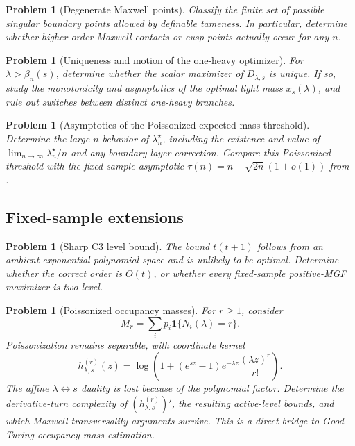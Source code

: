\documentclass[11pt]{article}
\theoremstyle{plain}
\newtheorem{problem}[theorem]{Problem}
\theoremstyle{definition}
\theoremstyle{remark}
\newcommand{\one}{\mathbf 1}
\begin{document}
\begin{problem}[Degenerate Maxwell points]
Classify the finite set of possible singular boundary points allowed by definable tameness.  In particular, determine whether higher-order Maxwell contacts or cusp points actually occur for any \(n\).
\end{problem}


\begin{problem}[Uniqueness and motion of the one-heavy optimizer]
For \(\lambda>\beta_n(s)\), determine whether the scalar maximizer of \(D_{\lambda,s}\) is unique.  If so, study the monotonicity and asymptotics of the optimal light mass \(x_s(\lambda)\), and rule out switches between distinct one-heavy branches.
\end{problem}

\begin{problem}[Asymptotics of the Poissonized expected-mass threshold]
Determine the large-\(n\) behavior of \(\lambda_n^\star\), including the existence and value of \(\lim_{n\to\infty}\lambda_n^\star/n\) and any boundary-layer correction.  Compare this Poissonized threshold with the fixed-sample asymptotic \(\tau(n)=n+\sqrt{2n}(1+o(1))\) from \cite{BerendKontorovich2012}.
\end{problem}

\subsection{Fixed-sample extensions}

\begin{problem}[Sharp C3 level bound]
The bound \(t(t+1)\) follows from an ambient exponential-polynomial space and is unlikely to be optimal.  Determine whether the correct order is \(O(t)\), or whether every fixed-sample positive-MGF maximizer is two-level.
\end{problem}

\begin{problem}[Poissonized occupancy masses]
For \(r\ge1\), consider
\[
M_r=\sum_i p_i\one\{N_i(\lambda)=r\}.
\]
Poissonization remains separable, with coordinate kernel
\[
h^{(r)}_{\lambda,s}(z)
=\log\left(1+(e^{sz}-1)e^{-\lambda z}
\frac{(\lambda z)^r}{r!}\right).
\]
The affine \(\lambda\leftrightarrow s\) duality is lost because of the polynomial factor.  Determine the derivative-turn complexity of \((h^{(r)}_{\lambda,s})'\), the resulting active-level bounds, and which Maxwell-transversality arguments survive.  This is a direct bridge to Good--Turing occupancy-mass estimation.
\end{problem}
\end{document}
